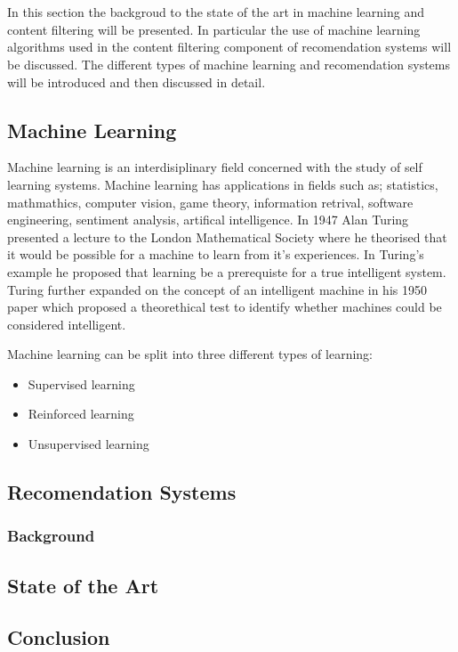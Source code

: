 \chapter{}

In this section the backgroud to the state of the art in machine learning and content filtering will be presented.
In particular the use of machine learning algorithms used in the content filtering component of recomendation systems will be discussed.
The different types of machine learning and recomendation systems will be introduced and then discussed in detail.


\section{Machine Learning}
Machine learning is an interdisiplinary field concerned with the study of self learning systems.
Machine learning has applications in fields such as; statistics, mathmathics, computer vision, game theory, information retrival, software engineering, sentiment analysis, artifical intelligence.
In 1947 Alan Turing presented a lecture to the London Mathematical Society where he theorised that it would be possible for a machine to learn from it's experiences.
In Turing's example he proposed that learning be a prerequiste for a true intelligent system.
Turing further expanded on the concept of an intelligent machine in his 1950 paper which proposed a theorethical test to identify whether machines could be considered intelligent.


Machine learning can be split into three different types of learning:
\begin{itemize}
    \item Supervised learning
    \item Reinforced learning
    \item Unsupervised learning
\end{itemize}

\section{Recomendation Systems}
\subsection{Background}

\section{State of the Art}

\section{Conclusion}
